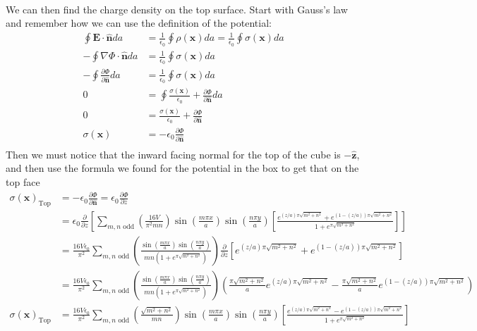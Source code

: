 \documentclass{article}
\begin{document}
\paragraph{}
We can then find the charge density on the top surface. Start with Gauss's law and remember how we can use the definition of the potential:
\begin{align*}
\oint \mathbf{E} \cdot \mathbf{\hat{n}} da &= \frac{1}{\epsilon_{0}} \oint \rho(\mathbf{x}) da = \frac{1}{\epsilon_{0}} \oint \sigma(\mathbf{x}) da\\
-\oint \nabla\Phi \cdot \mathbf{\hat{n}} da &= \frac{1}{\epsilon_{0}} \oint \sigma(\mathbf{x}) da\\
-\oint \frac{\partial\Phi}{\partial\mathbf{\hat{n}}} da &= \frac{1}{\epsilon_{0}} \oint \sigma(\mathbf{x}) da\\
0 &= \oint \frac{\sigma(\mathbf{x})}{\epsilon_{0}} +  \frac{\partial\Phi}{\partial\mathbf{\hat{n}}} da\\
0 &= \frac{\sigma(\mathbf{x})}{\epsilon_{0}} +  \frac{\partial\Phi}{\partial\mathbf{\hat{n}}}\\
\sigma(\mathbf{x}) &= -\epsilon_{0} \frac{\partial\Phi}{\partial\mathbf{\hat{n}}}\\
\end{align*}
Then we must notice that the inward facing normal for the top of the cube is $-\mathbf{\hat{z}}$, and then use the formula we found for the potential in the box to get that on the top face
\begin{align*}
\sigma(\mathbf{x})_{\text{Top}} &= -\epsilon_{0} \frac{\partial\Phi}{\partial\mathbf{\hat{n}}} = \epsilon_{0} \frac{\partial\Phi}{\partial z}\\
&= \epsilon_{0} \frac{\partial}{\partial z}\left[ \sum_{m,n \text{ odd}} \left(\frac{16V}{\pi^{2}mn}\right) \sin\left(\frac{ m\pi x }{ a }\right) \sin\left(\frac{ n\pi y }{ a }\right) \left[ \frac{ e^{(z/a)\pi\sqrt{m^{2} + n^{2}}} + e^{(1-(z/a))\pi\sqrt{m^{2} + n^{2}}}}{ 1 + e^{\pi\sqrt{m^{2} + n^{2}}} } \right] \right]\\
&= \frac{16V\epsilon_{0}}{\pi^{2}} \sum_{m,n \text{ odd}} \left( \frac{\sin\left(\frac{ m\pi x }{ a }\right) \sin\left(\frac{ n\pi y }{ a }\right)}{ mn \left( 1 + e^{\pi\sqrt{m^{2} + n^{2}}} \right)} \right) \frac{\partial}{\partial z}\left[ e^{(z/a)\pi\sqrt{m^{2} + n^{2}}} + e^{(1-(z/a))\pi\sqrt{m^{2} + n^{2}}} \right]\\
&= \frac{16V\epsilon_{0}}{\pi^{2}} \sum_{m,n \text{ odd}} \left( \frac{\sin\left(\frac{ m\pi x }{ a }\right) \sin\left(\frac{ n\pi y }{ a }\right)}{ mn \left( 1 + e^{\pi\sqrt{m^{2} + n^{2}}} \right)} \right) \left( \frac{\pi\sqrt{m^{2} + n^{2}}}{a} e^{(z/a)\pi\sqrt{m^{2} + n^{2}}} - \frac{ \pi\sqrt{m^{2} + n^{2}} }{a} e^{(1-(z/a))\pi\sqrt{m^{2} + n^{2}}} \right)\\
\sigma(\mathbf{x})_{\text{Top}} &= \frac{16V\epsilon_{0}}{\pi^{2}} \sum_{m,n \text{ odd}} \left( \frac{ \sqrt{m^{2} + n^{2}} }{ mn } \right) \sin\left(\frac{ m\pi x }{ a }\right) \sin\left(\frac{ n\pi y }{ a }\right) \left[ \frac{ e^{(z/a)\pi\sqrt{m^{2} + n^{2}}} - e^{(1-(z/a))\pi\sqrt{m^{2} + n^{2}}} }{ 1 + e^{\pi\sqrt{m^{2} + n^{2}}} } \right]\\
\end{align*}
\end{document}
